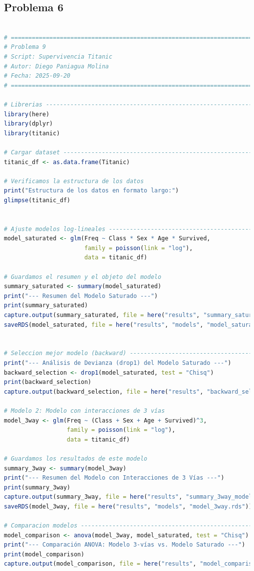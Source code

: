 \clearpage

\subsection{Problema \textcolor{CIMATRed}{6}}

\begin{lstlisting}[language=R, caption={Script: Supervivencia Titanic.}, label={lst:script8}]

# =============================================================================
# Problema 9
# Script: Supervivencia Titanic
# Autor: Diego Paniagua Molina
# Fecha: 2025-09-20
# =============================================================================

# Librerias -------------------------------------------------------------------
library(here)
library(dplyr)
library(titanic)

# Cargar dataset --------------------------------------------------------------
titanic_df <- as.data.frame(Titanic)

# Verificamos la estructura de los datos
print("Estructura de los datos en formato largo:")
glimpse(titanic_df)


# Ajuste modelos log-lineales -------------------------------------------------
model_saturated <- glm(Freq ~ Class * Sex * Age * Survived,
                       family = poisson(link = "log"),
                       data = titanic_df)

# Guardamos el resumen y el objeto del modelo
summary_saturated <- summary(model_saturated)
print("--- Resumen del Modelo Saturado ---")
print(summary_saturated)
capture.output(summary_saturated, file = here("results", "summary_saturated_model.txt"))
saveRDS(model_saturated, file = here("results", "models", "model_saturated.rds"))


# Seleccion mejor modelo (backward) -------------------------------------------
print("--- Análisis de Devianza (drop1) del Modelo Saturado ---")
backward_selection <- drop1(model_saturated, test = "Chisq")
print(backward_selection)
capture.output(backward_selection, file = here("results", "backward_selection_analysis.txt"))

# Modelo 2: Modelo con interacciones de 3 vías 
model_3way <- glm(Freq ~ (Class + Sex + Age + Survived)^3,
                  family = poisson(link = "log"),
                  data = titanic_df)

# Guardamos los resultados de este modelo
summary_3way <- summary(model_3way)
print("--- Resumen del Modelo con Interacciones de 3 Vías ---")
print(summary_3way)
capture.output(summary_3way, file = here("results", "summary_3way_model.txt"))
saveRDS(model_3way, file = here("results", "models", "model_3way.rds"))

# Comparacion modelos ---------------------------------------------------------
model_comparison <- anova(model_3way, model_saturated, test = "Chisq")
print("--- Comparación ANOVA: Modelo 3-vías vs. Modelo Saturado ---")
print(model_comparison)
capture.output(model_comparison, file = here("results", "model_comparison_anova.txt"))

\end{lstlisting}


